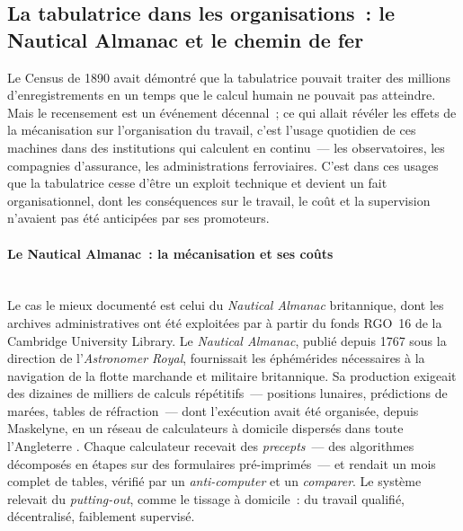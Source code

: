 

\subsection{La tabulatrice dans les organisations~: le Nautical Almanac et le chemin de fer}\label{subsec:zoom_tabulating}

Le Census de 1890 avait démontré que la tabulatrice pouvait traiter des millions d'enregistrements en un temps que le calcul humain ne pouvait pas atteindre. Mais le recensement est un événement décennal~; ce qui allait révéler les effets de la mécanisation sur l'organisation du travail, c'est l'usage quotidien de ces machines dans des institutions qui calculent en continu~--- les observatoires, les compagnies d'assurance, les administrations ferroviaires. C'est dans ces usages que la tabulatrice cesse d'être un exploit technique et devient un fait organisationnel, dont les conséquences sur le travail, le coût et la supervision n'avaient pas été anticipées par ses promoteurs.

\paragraph{Le Nautical Almanac~: la mécanisation et ses coûts}\mbox{}\\
Le cas le mieux documenté est celui du \emph{Nautical Almanac} britannique, dont les archives administratives ont été exploitées par \textcite{daston_calculation_2018} à partir du fonds RGO~16 de la Cambridge University Library. Le \emph{Nautical Almanac}, publié depuis 1767 sous la direction de l'\emph{Astronomer Royal}, fournissait les éphémérides nécessaires à la navigation de la flotte marchande et militaire britannique. Sa production exigeait des dizaines de milliers de calculs répétitifs~--- positions lunaires, prédictions de marées, tables de réfraction~--- dont l'exécution avait été organisée, depuis Maskelyne, en un réseau de calculateurs à domicile dispersés dans toute l'Angleterre \parencite{croarken_human_2009}. Chaque calculateur recevait des \og \emph{precepts}\fg{}~--- des algorithmes décomposés en étapes sur des formulaires pré-imprimés~--- et rendait un mois complet de tables, vérifié par un \emph{anti-computer} et un \emph{comparer}. Le système relevait du \emph{putting-out}, comme le tissage à domicile~: du travail qualifié, décentralisé, faiblement supervisé.

